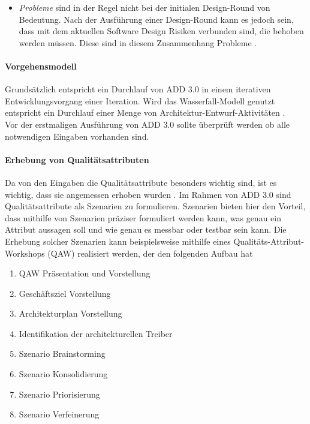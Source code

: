 \begin{itemize}
\begin{itemize}
\item \emph{Probleme} sind in der Regel nicht bei der initialen Design-Round von Bedeutung. Nach der Ausführung einer Design-Round kann es jedoch sein, dass mit dem aktuellen Software Design Risiken verbunden sind, die behoben werden müssen. Diese sind in diesem Zusammenhang Probleme \cite{add3}.\\
\end{itemize}
\end{itemize}

\paragraph{Vorgehensmodell}
Grundsätzlich entspricht ein Durchlauf von ADD 3.0 in einem iterativen Entwicklungsvorgang einer Iteration. Wird das Wasserfall-Modell genutzt entspricht ein Durchlauf einer Menge von Architektur-Entwurf-Aktivitäten \cite{add3}.\\

Vor der erstmaligen Ausführung von ADD 3.0 sollte überprüft werden ob alle notwendigen Eingaben vorhanden sind.\\

\paragraph{Erhebung von Qualitätsattributen}
Da von den Eingaben die Qualitätsattribute besonders wichtig sind, ist es wichtig, dass sie angemessen erhoben wurden \cite{add3}. Im Rahmen von ADD 3.0 sind Qualitätsattribute als Szenarien zu formulieren. Szenarien bieten hier den Vorteil, dass mithilfe von Szenarien präziser formuliert werden kann, was genau ein Attribut aussagen soll und wie genau es messbar oder testbar sein kann. Die Erhebung solcher Szenarien kann beispielsweise mithilfe eines Qualitäts-Attribut-Workshops (QAW) realisiert werden, der den folgenden Aufbau hat \cite{add3}\\

\begin{enumerate}
\item QAW Präsentation und Vorstellung
\item Geschäftsziel Vorstellung
\item Architekturplan Vorstellung
\item Identifikation der architekturellen Treiber
\item Szenario Brainstorming
\item Szenario Konsolidierung
\item Szenario Priorisierung
\item Szenario Verfeinerung \\
\end{enumerate}

